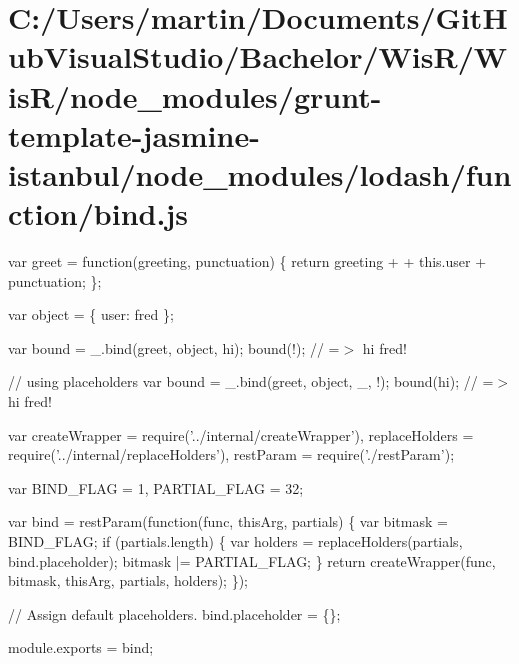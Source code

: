\hypertarget{_c_1_2_users_2martin_2_documents_2_git_hub_visual_studio_2_bachelor_2_wis_r_2_wis_r_2node_module77594a2ce89c0de1dcc42b99895517ba}{}\section{C\+:/\+Users/martin/\+Documents/\+Git\+Hub\+Visual\+Studio/\+Bachelor/\+Wis\+R/\+Wis\+R/node\+\_\+modules/grunt-\/template-\/jasmine-\/istanbul/node\+\_\+modules/lodash/function/bind.\+js}
var greet = function(greeting, punctuation) \{ return greeting + \textquotesingle{} \textquotesingle{} + this.\+user + punctuation; \};

var object = \{ \textquotesingle{}user\textquotesingle{}\+: \textquotesingle{}fred\textquotesingle{} \};

var bound = \+\_\+.\+bind(greet, object, \textquotesingle{}hi\textquotesingle{}); bound(\textquotesingle{}!\textquotesingle{}); // =$>$ \textquotesingle{}hi fred!\textquotesingle{}

// using placeholders var bound = \+\_\+.\+bind(greet, object, \+\_\+, \textquotesingle{}!\textquotesingle{}); bound(\textquotesingle{}hi\textquotesingle{}); // =$>$ \textquotesingle{}hi fred!\textquotesingle{}


\begin{DoxyCodeInclude}
var createWrapper = require(\textcolor{stringliteral}{'../internal/createWrapper'}),
    replaceHolders = require(\textcolor{stringliteral}{'../internal/replaceHolders'}),
    restParam = require(\textcolor{stringliteral}{'./restParam'});

var BIND\_FLAG = 1,
    PARTIAL\_FLAG = 32;

var bind = restParam(\textcolor{keyword}{function}(func, thisArg, partials) \{
  var bitmask = BIND\_FLAG;
  \textcolor{keywordflow}{if} (partials.length) \{
    var holders = replaceHolders(partials, bind.placeholder);
    bitmask |= PARTIAL\_FLAG;
  \}
  \textcolor{keywordflow}{return} createWrapper(func, bitmask, thisArg, partials, holders);
\});

\textcolor{comment}{// Assign default placeholders.}
bind.placeholder = \{\};

module.exports = bind;
\end{DoxyCodeInclude}
 